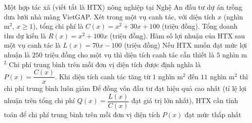 \begin{ex}%
	Một hợp tác xã (viết tắt là HTX) nông nghiệp tại Nghệ An đầu tư dự án trồng dưa lưới nhà màng VietGAP. Xét trong một vụ canh tác, với diện tích $x$ (nghìn m$^2$, $x \geq 1$), tổng chi phí là $C(x)=x^2+30x+100$ (triệu đồng). Tổng doanh thu dự kiến là $R(x)=x^2+100x$ (triệu đồng).
	\choiceTF
		{\True Hàm số lợi nhuận của HTX sau một vụ canh tác là $L(x)=70x-100$ (triệu đồng)}
		{\True Nếu HTX muốn đạt mức lợi nhuận là $250$ triệu đồng cho một vụ thì diện tích canh tác cần thiết là $5$ nghìn m$^2$}
		{Chi phí trung bình trên mỗi đơn vị diện tích được định nghĩa là $P(x)=\dfrac{C(x)}{x}$. Khi diện tích canh tác tăng từ $1$ nghìn m$^2$ đến $11$ nghìn m$^2$ thì chi phí trung bình luôn giảm}
		{Để đồng vốn đầu tư đạt hiệu quả cao nhất (tỉ lệ lợi nhuận trên tổng chi phí $Q(x)=\dfrac{L(x)}{C(x)}$ đạt giá trị lớn nhất), HTX cần tính toán để chi phí trung bình trên mỗi đơn vị diện tích $P(x)$ đạt mức thấp nhất}
\end{ex}
